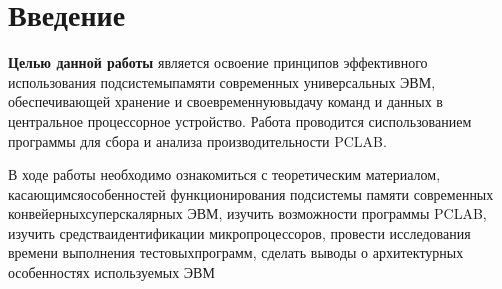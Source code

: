 \chapter*{Введение}

\textbf{Целью данной работы} является освоение принципов эффективного использования подсистемыпамяти современных универсальных ЭВМ, обеспечивающей хранение и своевременнуювыдачу команд и данных в центральное процессорное устройство. Работа проводится сиспользованием программы для сбора и анализа производительности PCLAB. 

В ходе работы необходимо ознакомиться с теоретическим материалом, касающимсяособенностей   функционирования   подсистемы   памяти   современных   конвейерныхсуперскалярных   ЭВМ,   изучить   возможности   программы  PCLAB,   изучить   средстваидентификации микропроцессоров, провести исследования времени выполнения тестовыхпрограмм, сделать выводы о архитектурных особенностях используемых ЭВМ

